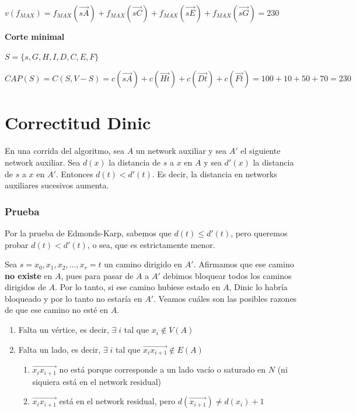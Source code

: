\documentclass[10pt,a4paper]{article}
\begin{document}
\textbf{$v(f_{MAX}) = f_{MAX} (\overrightarrow{sA}) + f_{MAX} (\overrightarrow{sC}) + f_{MAX} (\overrightarrow{sE}) + f_{MAX} (\overrightarrow{sG}) = 230$}

\textbf{Corte minimal}

\textbf{$S= \{s, G, H, I, D, C, E, F\}
$}

\textbf{$CAP(S) = C(S, V- S) = c(\overrightarrow{sA}) + c(\overrightarrow{Ht}) + c(\overrightarrow{Dt}) + c(\overrightarrow{Ft}) = 100 + 10 + 50 + 70 = 230$}

\section*{Correctitud Dinic}

En una corrida del algoritmo, sea $A$ un network auxiliar y sea $A'$ el siguiente network auxiliar. Sea $d(x)$ la distancia de $s$ a $x$ en $A$ y sea $d'(x)$ la distancia de $s$ a $x$ en $A'$. Entonces $d(t) < d'(t)$. Es decir, la distancia en networks auxiliares sucesivos aumenta.

\subsubsection*{Prueba}

Por la prueba de Edmonds-Karp, sabemos que $d(t) \leq d'(t)$, pero queremos probar $d(t) < d'(t)$, o sea, que es estrictamente menor.

Sea $s=x_0, x_1, x_2,\dots, x_r=t$ un camino dirigido en $A'$. Afirmamos que ese camino \textbf{no existe} en $A$, pues para pasar de $A$ a $A'$ debimos bloquear todos los caminos dirigidos de $A$. Por lo tanto, si ese camino hubiese estado en $A$, Dinic lo habría bloqueado y por lo tanto no estaría en $A'$. Veamos cuáles son las posibles razones de que ese camino no esté en $A$.

\begin{enumerate}

	\item Falta un vértice, es decir, $\exists\;i$ tal que $x_i\not\in V(A)$
	\item Falta un lado, es decir, $\exists\;i$ tal que $\overrightarrow{x_ix_{i+1}} \not \in E(A) $
	\begin{enumerate}

		\item $\overrightarrow{x_ix_{i+1}}$ no está porque corresponde a un lado vacío o saturado en $N$ (ni siquiera está en el network residual)
		\item $\overrightarrow{x_ix_{i+1}}$ está en el network residual, pero $d(\overrightarrow{x_{i+1}})\neq d(x_i) + 1$
	\end{enumerate}
	
\end{enumerate}
\end{document}

